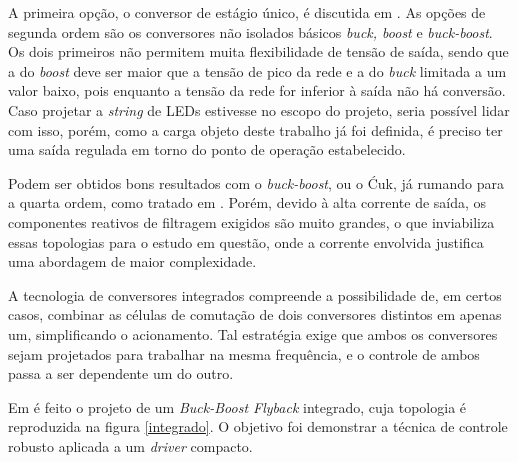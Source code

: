 \documentclass[
        12pt,
        openany, %
        oneside, %
        a4paper,			
        english,			
        brazil
        ]{abntbibufjf}
\begin{document}
A primeira opção, o conversor de estágio único, é discutida em \cite{guilherme-dissert}. As opções de segunda ordem são os conversores não isolados básicos \textit{buck, boost} e \textit{buck-boost}. Os dois primeiros não permitem muita flexibilidade de tensão de saída, sendo que a do \textit{boost} deve ser maior que a tensão de pico da rede e a do \textit{buck} limitada a um valor baixo, pois enquanto a tensão da rede for inferior à saída não há conversão. Caso projetar a \textit{string} de LEDs estivesse no escopo do projeto, seria possível lidar com isso, porém, como a carga objeto deste trabalho já foi definida, é preciso ter uma saída regulada em torno do ponto de operação estabelecido.


Podem ser obtidos bons resultados com o \textit{buck-boost}, ou o \'Cuk, já rumando para a quarta ordem, como tratado em \cite{guilherme-dissert}. Porém, devido à alta corrente de saída, os componentes reativos de filtragem exigidos são muito grandes, o que inviabiliza essas topologias para o estudo em questão, onde a corrente envolvida justifica uma abordagem de maior complexidade.





A tecnologia de conversores integrados compreende a possibilidade de, em certos casos, combinar as células de comutação de dois conversores distintos em apenas um, simplificando o acionamento. Tal estratégia exige que ambos os conversores sejam projetados para trabalhar na mesma frequência, e o controle de ambos passa a ser dependente um do outro.

Em \cite{bruno} é feito o projeto de um \textit{Buck-Boost Flyback} integrado, cuja topologia é reproduzida na figura \ref{integrado}. O objetivo foi demonstrar a técnica de controle robusto aplicada a um \textit{driver} compacto.
\end{document}
